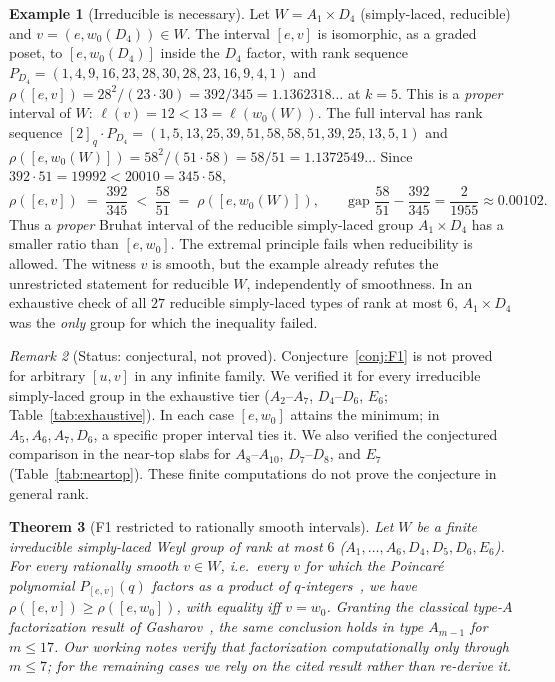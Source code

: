 \documentclass[11pt]{amsart}
\theoremstyle{plain}
\newtheorem{theorem}{Theorem}[section]
\theoremstyle{definition}
\newtheorem{example}[theorem]{Example}
\theoremstyle{remark}
\newtheorem{remark}[theorem]{Remark}
\newcommand{\W}{W}
\begin{document}
\begin{example}[Irreducible is necessary]
\label{ex:F1-irreducible}
Let $\W=A_1\times D_4$ (simply-laced, reducible) and $v=(e,w_0(D_4))\in\W$.
The interval $[e,v]$ is isomorphic, as a graded poset, to $[e,w_0(D_4)]$
inside the $D_4$ factor, with rank sequence $P_{D_4}=
(1,4,9,16,23,28,30,28,23,16,9,4,1)$ and
$\rho([e,v])=28^2/(23\cdot30)=392/345=1.1362318\ldots$ at $k=5$. This is a
\emph{proper} interval of $\W$: $\ell(v)=12<13=\ell(w_0(\W))$. The full
interval has rank sequence $[2]_q\cdot P_{D_4}=
(1,5,13,25,39,51,58,58,51,39,25,13,5,1)$ and
$\rho([e,w_0(\W)])=58^2/(51\cdot58)=58/51=1.1372549\ldots$ Since
$392\cdot51=19992<20010=345\cdot58$,
\[
\rho([e,v]) \;=\; \frac{392}{345} \;<\; \frac{58}{51} \;=\; \rho([e,w_0(\W)]),
\qquad \text{gap } \frac{58}{51}-\frac{392}{345}=\frac{2}{1955}\approx0.00102.
\]
Thus a \emph{proper} Bruhat interval of the reducible simply-laced group
$A_1\times D_4$ has a smaller ratio than $[e,w_0]$. The extremal principle fails when reducibility is allowed. The witness $v$ is smooth,
but the example already refutes the unrestricted statement for reducible
$\W$, independently of smoothness. In an exhaustive check of all $27$
reducible simply-laced types of rank at most $6$, $A_1\times D_4$ was the
\emph{only} group for which the inequality failed.
\end{example}

\begin{remark}[Status: conjectural, not proved]
Conjecture~\ref{conj:F1} is not proved for arbitrary $[u,v]$ in any
infinite family. We verified it for every irreducible simply-laced group in the exhaustive tier
($A_2$--$A_7$, $D_4$--$D_6$, $E_6$;
Table~\ref{tab:exhaustive}). In each case $[e,w_0]$ attains the minimum;
in $A_5,A_6,A_7,D_6$, a specific proper interval ties it. We also verified
the conjectured comparison in the near-top slabs for
$A_8$--$A_{10}$, $D_7$--$D_8$, and $E_7$
(Table~\ref{tab:neartop}). These finite computations do not prove the
conjecture in general rank.
\end{remark}

\begin{theorem}[F1 restricted to rationally smooth intervals]
\label{thm:F1-smooth}
Let $\W$ be a finite irreducible simply-laced Weyl group of rank at most $6$
($A_1,\dots,A_6,D_4,D_5,D_6,E_6$). For every rationally smooth $v\in\W$,
i.e.\ every $v$ for which the Poincar\'e polynomial $P_{[e,v]}(q)$ factors
as a product of $q$-integers~\cite{carrell1994,gasharov1998}, we have
$\rho([e,v])\ge\rho([e,w_0])$, with equality iff $v=w_0$. Granting the
classical type-$A$ factorization result of Gasharov~\cite{gasharov1998},
the same conclusion holds in type $A_{m-1}$ for $m\le17$.
Our
working notes verify that factorization computationally only through
$m\le7$; for the remaining cases we rely on the cited result rather than
re-derive it.
\end{theorem}
\end{document}
